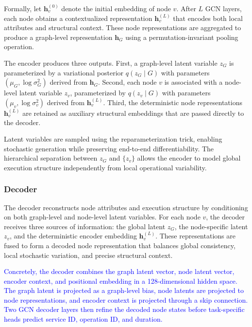 \documentclass[sigconf,review]{acmart}
\begin{document}
Formally, let $\mathbf{h}_v^{(0)}$ denote the initial embedding of node $v$. After $L$ GCN layers, each node obtains a contextualized representation $\mathbf{h}_v^{(L)}$ that encodes both local attributes and structural context. These node representations are aggregated to produce a graph-level representation $\mathbf{h}_G$ using a permutation-invariant pooling operation.

The encoder produces three outputs. First, a graph-level latent variable $z_G$ is parameterized by a variational posterior $q(z_G \mid G)$ with parameters $(\mu_G, \log \sigma_G^2)$ derived from $\mathbf{h}_G$. Second, each node $v$ is associated with a node-level latent variable $z_v$, parameterized by $q(z_v \mid G)$ with parameters $(\mu_v, \log \sigma_v^2)$ derived from $\mathbf{h}_v^{(L)}$. Third, the deterministic node representations $\mathbf{h}_v^{(L)}$ are retained as auxiliary structural embeddings that are passed directly to the decoder.

Latent variables are sampled using the reparameterization trick, enabling stochastic generation while preserving end-to-end differentiability. The hierarchical separation between $z_G$ and $\{z_v\}$ allows the encoder to model global execution structure independently from local operational variability.

\subsubsection{Decoder}

The decoder reconstructs node attributes and execution structure by conditioning on both graph-level and node-level latent variables. For each node $v$, the decoder receives three sources of information: the global latent $z_G$, the node-specific latent $z_v$, and the deterministic encoder embedding $\mathbf{h}_v^{(L)}$. These representations are fused to form a decoded node representation that balances global consistency, local stochastic variation, and precise structural context.

\textcolor{blue}{Concretely, the decoder combines the graph latent vector, node latent vector, encoder context, and positional embedding in a 128-dimensional hidden space. The graph latent is projected as a graph-level bias, node latents are projected to node representations, and encoder context is projected through a skip connection. Two GCN decoder layers then refine the decoded node states before task-specific heads predict service ID, operation ID, and duration.}
\end{document}

